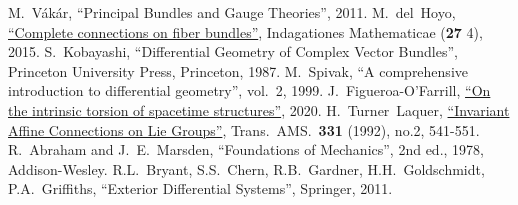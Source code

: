 \begin{thebibliography}{}
     M.~V\'ak\'ar, ``Principal Bundles and Gauge Theories'', 2011.
     M.~del~Hoyo, \href{https://arxiv.org/abs/1512.03847}{``Complete connections on fiber bundles''}, Indagationes Mathematicae (\textbf{27} 4), 2015.
     S.~Kobayashi, ``Differential Geometry of Complex Vector Bundles'', Princeton University Press, Princeton, 1987.
     M.~Spivak, ``A comprehensive introduction to differential geometry'', vol.~2, 1999.
     J.~Figueroa-O'Farrill, \href{https://arxiv.org/abs/2009.01948v1}{``On the intrinsic torsion of spacetime structures''}, 2020.
     H.~Turner~Laquer, \href{https://doi.org/10.2307/2154126}{``Invariant Affine Connections on Lie Groups''}, Trans.~AMS.~\textbf{331} (1992), no.2, 541-551.
     R.~Abraham and J.~E.~Marsden, ``Foundations of Mechanics'', 2nd ed., 1978, Addison-Wesley.
     R.L.~Bryant, S.S.~Chern, R.B.~Gardner, H.H.~Goldschmidt, P.A.~Griffiths, ``Exterior Differential Systems'', Springer, 2011.
\end{thebibliography}